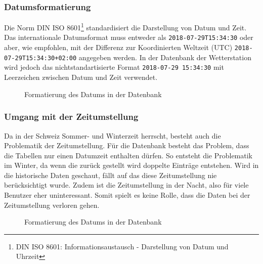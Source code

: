 

\subsubsection{Datumsformatierung}
Die Norm DIN ISO 8601\footnote{DIN ISO 8601: Informationsaustausch - Darstellung von Datum und Uhrzeit} standardisiert die Darstellung von Datum und Zeit. Das internationale Datumsformat muss entweder als \texttt{2018-07-29T15:34:30} oder aber, wie empfohlen, mit der Differenz zur Koordinierten Weltzeit (UTC) \texttt{2018-07-29T15:34:30+02:00} angegeben werden. In der Datenbank der Wetterstation wird jedoch das nichtstandartisierte Format \texttt{2018-07-29 15:34:30} mit Leerzeichen zwischen Datum und Zeit verwendet.


\begin{figure}[htbp!]
	\centering
	\caption{Formatierung des Datums in der Datenbank}
	\label{img:datetime}
\end{figure}


\subsubsection{Umgang mit der Zeitumstellung}
Da in der Schweiz Sommer- und Winterzeit herrscht, besteht auch die Problematik der Zeitumstellung. Für die Datenbank besteht das Problem, dass die Tabellen nur einen Datumzeit enthalten dürfen. So entsteht die Problematik im Winter, da wenn die zurück gestellt wird doppelte Einträge entstehen. Wird in die historische Daten geschaut, fällt auf das diese Zeitumstellung nie berücksichtigt wurde. Zudem ist die Zeitumstellung in der Nacht, also für viele Benutzer eher uninteressant. Somit spielt es keine Rolle, dass die Daten bei der Zeitumstellung verloren gehen.

\begin{figure}[htbp!]
	\centering
	\caption{Formatierung des Datums in der Datenbank}
	\label{img:sommerzeit}
\end{figure}


